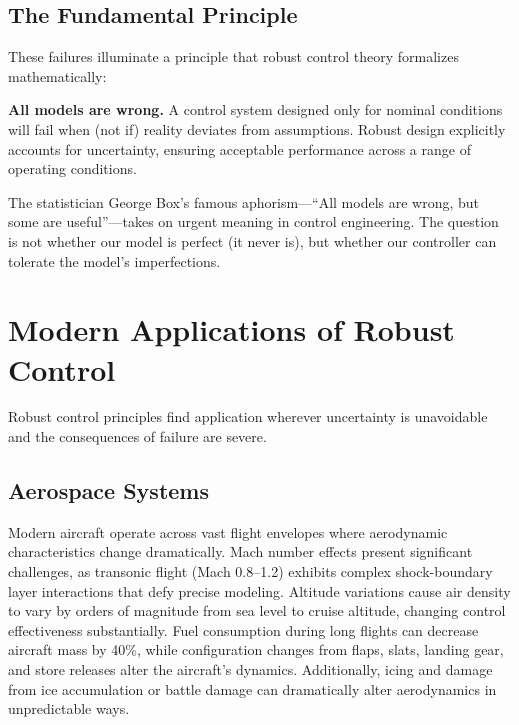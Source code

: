 \subsection{The Fundamental Principle}
\label{subsec:fundamental}

These failures illuminate a principle that robust control theory formalizes mathematically:

\begin{tcolorbox}[colback=blue!5!white,colframe=blue!75!black,title=The Robustness Principle,sharp corners]
\textbf{All models are wrong.} A control system designed only for nominal conditions will fail when (not if) reality deviates from assumptions. Robust design explicitly accounts for uncertainty, ensuring acceptable performance across a range of operating conditions.
\end{tcolorbox}

The statistician George Box's famous aphorism---``All models are wrong, but some are useful''---takes on urgent meaning in control engineering. The question is not whether our model is perfect (it never is), but whether our controller can tolerate the model's imperfections.

\section{Modern Applications of Robust Control}
\label{sec:modern_applications}

Robust control principles find application wherever uncertainty is unavoidable and the consequences of failure are severe.

\subsection{Aerospace Systems}

Modern aircraft operate across vast flight envelopes where aerodynamic characteristics change dramatically. Mach number effects present significant challenges, as transonic flight (Mach 0.8--1.2) exhibits complex shock-boundary layer interactions that defy precise modeling. Altitude variations cause air density to vary by orders of magnitude from sea level to cruise altitude, changing control effectiveness substantially. Fuel consumption during long flights can decrease aircraft mass by 40\%, while configuration changes from flaps, slats, landing gear, and store releases alter the aircraft's dynamics. Additionally, icing and damage from ice accumulation or battle damage can dramatically alter aerodynamics in unpredictable ways.

